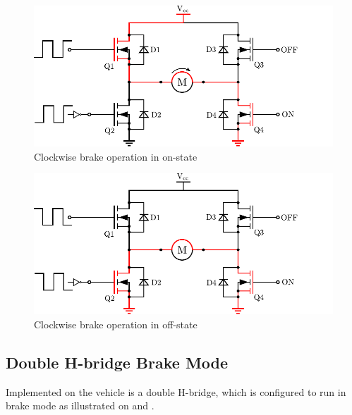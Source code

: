   \begin{minipage}{\linewidth}
  	\centering
  	\begin{minipage}{0.45\linewidth}
  		\begin{figure}[H]
  			\centering
  			\includegraphics[scale=.6]{figures/HbridgeClockwiseBrakeON.pdf}
  			\caption{Clockwise brake operation in on-state}
  			\label{HbridgeClockwiseBrakeON}
  		\end{figure}
  	\end{minipage}
  	\hspace{0.03\linewidth}
  	\begin{minipage}{0.45\linewidth}
  		\begin{figure}[H]
  			\centering
  			\includegraphics[scale=.6]{figures/HbridgeClockwiseBrakeOFF.pdf}
  			\caption{Clockwise brake operation in off-state}
  			\label{HbridgeClockwiseBrakeOFF}
  		\end{figure}
  	\end{minipage}
  \end{minipage}

\subsection{Double H-bridge Brake Mode}
Implemented on the vehicle is a double H-bridge, which is configured to run in brake mode as illustrated on  and .

